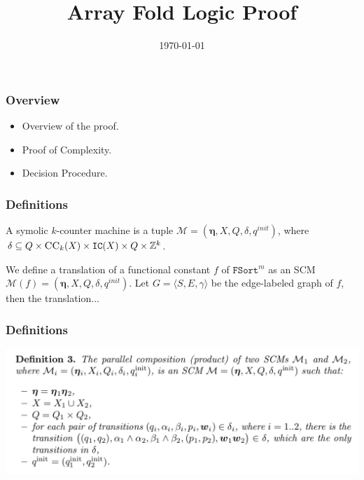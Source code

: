 \documentclass[11pt]{beamer}
\title{Array Fold Logic Proof}
\date{\today}
\begin{document}
\maketitle
\begin{frame}\frametitle{Overview }
\begin{itemize}
\item  Overview of the proof.


\item Proof of Complexity.

\item Decision Procedure.

           
\end{itemize}
\end{frame}
\begin{frame}\frametitle{Definitions}
\begin{definition}[SMC]
A symolic $k$-counter machine is a tuple $\mathcal{M} = (\mathbf{\eta}, X, Q, \delta, q^{init})$, where 
$\delta \subseteq Q \times \textsc{CC}_k(X) \times \texttt{IC}(X) \times Q \times \mathbb{Z}^k$.

\end{definition}
\begin{definition}[Translation]
We define a translation of a functional constant $f$ of $\texttt{FSort}^m$ as an SCM $\mathcal{M}(f) = (\mathbf{\eta}, X, Q, \delta, q^{init})$. Let $G = \langle S, E, \gamma\rangle$ be the edge-labeled graph of $f$, then the translation... 
\end{definition}

\end{frame}

\begin{frame}\frametitle{Definitions}
\begin{center}
\includegraphics[scale=0.28]{para.png}
\end{center}
\end{frame}
\end{document}
